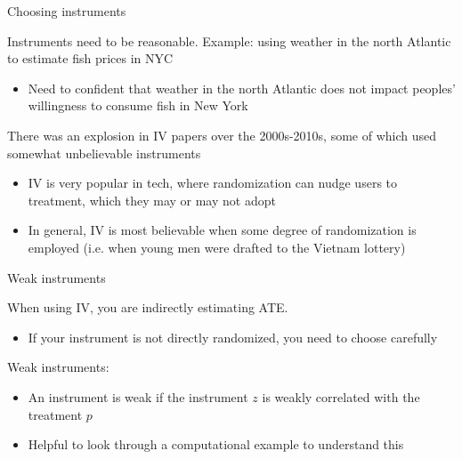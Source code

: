\documentclass[compress, 8pt]{beamer}
\begin{document}
\begin{frame}{Choosing instruments}

Instruments need to be reasonable. Example: using weather in the north Atlantic to estimate fish prices in NYC
\begin{itemize}
    \item Need to confident that weather in the north Atlantic does not impact peoples' willingness to consume fish in New York
\end{itemize}

\vspace{3ex}
There was an explosion in IV papers over the 2000s-2010s, some of which used somewhat unbelievable instruments
\begin{itemize}
    \item IV is very popular in tech, where randomization can nudge users to treatment, which they may or may not adopt
    \item In general, IV is most believable when some degree of randomization is employed (i.e. when young men were drafted to the Vietnam lottery)
\end{itemize}

\end{frame}



\begin{frame}{Weak instruments}

When using IV, you are indirectly estimating ATE. 
\begin{itemize}
    \item If your instrument is not directly randomized, you need to choose carefully
\end{itemize}

Weak instruments:
\begin{itemize}
    \item An instrument is weak if the instrument $z$ is weakly correlated with the treatment $p$
    \item Helpful to look through a computational example to understand this
\end{itemize}

\end{frame}
\end{document}
